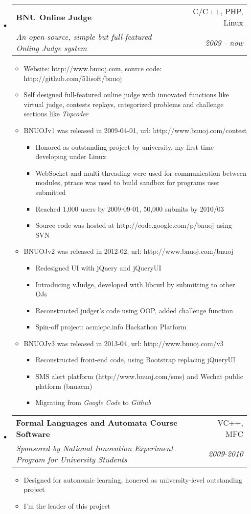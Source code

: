 \documentclass[letterpaper,11pt]{article}
\makeatletter
\newcommand{\resitem}[1]{\item #1 \vspace{0pt}}
\newcommand{\ressubheading}[4]{
    \begin{tabular*}{6.5in}{l@{\cftdotfill{\cftsecdotsep}\extracolsep{\fill}}r}
        \textbf{#1} & #2 \\
        \textit{#3} & \textit{#4} \\
    \end{tabular*}\vspace{-6pt}
}
\makeatother
\begin{document}
    \begin{itemize}
        \item
            \ressubheading{BNU Online Judge}{C/C++, PHP, Linux}{An open-source, simple but full-featured Onling Judge system}{2009 - now}
            \begin{itemize}
                \resitem{Website: http://www.bnuoj.com, source code: http://github.com/51isoft/bnuoj}
                \resitem{Self designed full-featured online judge with innovated functions like virtual judge, contests replays, categorized problems and challenge sections like {\it Topcoder} }
                \resitem{BNUOJv1 was released in 2009-04-01, url: http://www.bnuoj.com/contest}
                \begin{itemize}
                    \resitem{Honored as outstanding project by university, my first time developing under Linux}
                    \resitem{WebSocket and multi-threading were used for communication between modules, ptrace was used to build sandbox for programs user submitted}
                    \resitem{Reached 1,000 users by 2009-09-01, 50,000 submits by 2010/03}
                    \resitem{Source code was hosted at http://code.google.com/p/bnuoj using SVN}
                \end{itemize}
                \resitem{BNUOJv2 was released in 2012-02, url: http://www.bnuoj.com/bnuoj}
                \begin{itemize}
                    \resitem{Redesigned UI with jQuery and jQueryUI}
                    \resitem{Introducing vJudge, developed with libcurl by submitting to other OJs}
                    \resitem{Reconstructed judger's code using OOP, added challenge function}
                    \resitem{Spin-off project: acmicpc.info Hackathon Platform}
                \end{itemize}
                \resitem{BNUOJv3 was released in 2013-04, url: http://www.bnuoj.com/v3}
                \begin{itemize}
                    \resitem{Reconstructed front-end code, using Bootstrap replacing jQueryUI}
                    \resitem{SMS alert platform (http://www.bnuoj.com/sms) and Wechat public platform (bnuacm) }
                    \resitem{Migrating from {\it Google Code} to {\it Github}}
                \end{itemize}
            \end{itemize}
        \item
            \ressubheading{Formal Languages and Automata Course Software}{VC++, MFC}{Sponsored by National Innovation Experiment Program for University Students}{2009-2010}
            \begin{itemize}
                \resitem{Designed for autonomic learning, honered as university-level outstanding project}
                \resitem{I'm the leader of this project}
            \end{itemize}
    \end{itemize}
\end{document}
